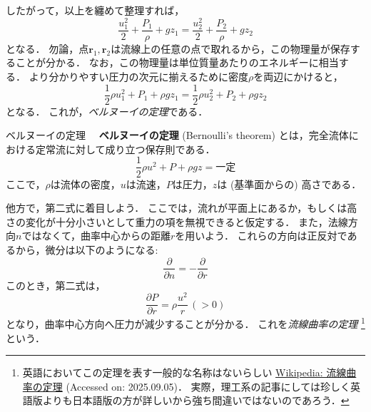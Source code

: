 \documentclass[uplatex,dvipdfmx,a4j,11pt]{jsreport}
\newcommand{\keyword}[1]{\textcolor{mainblue}{\textbf{#1}}}
\numberwithin{equation}{chapter}
\begin{document}
したがって，以上を纏めて整理すれば，
\begin{equation}
  \frac{u_1^2}{2} + \frac{P_1}{\rho} + gz_1 = \frac{u_2^2}{2} + \frac{P_2}{\rho} + gz_2
\end{equation}
となる．
勿論，点$\mathbf{r}_1, \mathbf{r}_2$は流線上の任意の点で取れるから，この物理量が保存することが分かる．
なお，この物理量は単位質量あたりのエネルギーに相当する．
より分かりやすい圧力の次元に揃えるために密度$\rho$を両辺にかけると，
\begin{equation}
  \frac{1}{2}\rho u_1^2 + P_1 + \rho gz_1 = \frac{1}{2}\rho u_2^2 + P_2 + \rho gz_2 
  \label{eq:bernoulli_equation}
\end{equation}
となる．
これが，\emph{ベルヌーイの定理}である．

\begin{definition}{ベルヌーイの定理}{}{}
  　\keyword{ベルヌーイの定理} (Bernoulli's theorem) とは，完全流体における定常流に対して成り立つ保存則である．
  \begin{equation}
    \frac{1}{2}\rho u^2 + P + \rho gz = \text{一定}
  \end{equation}
  ここで，$\rho$は流体の密度，$u$は流速，$P$は圧力，$z$は (基準面からの) 高さである．
\end{definition}

他方で，第二式に着目しよう．
ここでは，流れが平面上にあるか，もしくは高さの変化が十分小さいとして重力の項を無視できると仮定する．
また，法線方向$n$ではなくて，曲率中心からの距離$r$を用いよう．
これらの方向は正反対であるから，微分は以下のようになる:
\begin{equation}
  \frac{\partial }{\partial n} = -\frac{\partial }{\partial r}
\end{equation}
このとき，第二式は，
\begin{equation*}
  \frac{\partial P}{\partial r} = \rho \frac{u^2}{r} \,(> 0)
\end{equation*}
となり，曲率中心方向へ圧力が減少することが分かる．
これを\emph{流線曲率の定理} 
\footnote{
  英語においてこの定理を表す一般的な名称はないらしい
    \href{https://ja.wikipedia.org/wiki/\%E6\%B5\%81\%7B\%9A\%B2\%7E\%81\%AE\%5A\%E9\%A0\%9A\%7D}{Wikipedia: 流線曲率の定理} (Accessed on: 2025.09.05)．
  実際，理工系の記事にしては珍しく英語版よりも日本語版の方が詳しいから強ち間違いではないのであろう．
}
という．
\end{document}
